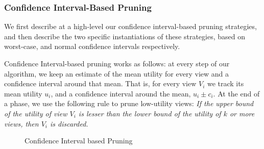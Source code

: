 \subsubsection{Confidence Interval-Based Pruning}
\label{sec:confidence_interval}
We first describe at a high-level our confidence interval-based pruning strategies,
and then describe the two specific instantiations of these strategies,
based on worst-case, and normal confidence intervals respectively.

Confidence Interval-based pruning works as follows: at every step of our
algorithm, we keep an estimate of the mean utility for every view and a
confidence interval around that mean.
That is, for every view $V_i$ we track its mean utility $u_i$, and a
confidence interval around the mean, $u_i \pm c_i$. 
At the end of a phase, we use the following rule to prune low-utility
views:
{\em If the upper bound of the utility of view $V_i$ is lesser
than the lower bound of the utility of $k$ or more views, then $V_i$ is discarded.}

\begin{figure}[h]
\vspace{-10pt}
\centerline{
\hbox{}}
\vspace{-20pt}
\caption{Confidence Interval based Pruning}
\label{fig:conf_interval}
\vspace{-15pt}
\end{figure}

